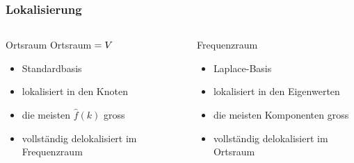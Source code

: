 %
%
%
\bgroup
\begin{frame}[t]
\setlength{\abovedisplayskip}{5pt}
\setlength{\belowdisplayskip}{5pt}
\frametitle{Lokalisierung}
\vspace{-20pt}
\begin{columns}[t,onlytextwidth]
\begin{column}{0.48\textwidth}
\begin{block}{Ortsraum}
Ortsraum$\mathstrut=V$
\begin{itemize}
\item<3-> Standardbasis
\item<5-> lokalisiert in den Knoten
\item<7-> die meisten $\hat{f}(k)$ gross
\item<9-> vollständig delokalisiert im Frequenzraum
\end{itemize}
\end{block}
\end{column}
\begin{column}{0.48\textwidth}
\begin{block}{Frequenzraum}
\begin{itemize}
\item<4-> Laplace-Basis
\item<6-> lokalisiert in den Eigenwerten
\item<8-> die meisten Komponenten gross
\item<10-> vollständig delokalisiert im Ortsraum
\end{itemize}
\end{block}
\end{column}
\end{columns}
\end{frame}
\egroup
